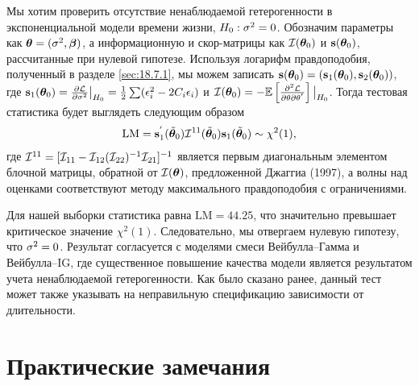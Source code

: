 Мы хотим проверить отсутствие ненаблюдаемой гетерогенности в экспоненциальной модели времени жизни, $H_0:\sigma^2=0$. Обозначим параметры как $\bm{\theta} = (\sigma^2, \bm{\beta})$, а информационную и скор-матрицы как $\mathcal{I}(\bm{\theta}_0)$ и $\mathbf{s}(\bm{\theta}_0)$, рассчитанные при нулевой гипотезе. Используя логарифм правдоподобия, полученный в разделе \ref{sec:18.7.1}, мы можем записать $\mathbf{s}(\bm{\theta}_0) = (\mathbf{s}_1(\bm{\theta}_0),\mathbf{s}_2(\bm{\theta}_0))$, где $\mathbf{s}_1(\bm{\theta}_0) = \frac{\partial\mathcal{L}}{\partial\sigma^2}\big|_{H_0} = \frac{1}{2}\sum(\epsilon^{2}_{i} - 2C_i\epsilon_i)$ и $\mathcal{I}(\bm{\theta}_0) = -\mathbb{E}\left[\frac{\partial^2\mathcal{L}}{\partial\theta\partial\theta^{'}}\right]\big|_{H_0}$. Тогда тестовая статистика будет выглядеть следующим образом
    \begin{align}
        \label{eq:18.36}
            \mathrm{LM} = \mathbf{s}^{'}_{1}(\tilde{\bm{\theta}}_0)\mathcal{I}^{11}(\tilde{\bm{\theta}}_0)\mathbf{s}_1(\tilde{\bm{\theta}}_0)\sim\chi^2(1),
    \end{align}
где $\mathcal{I}^{11} = [\mathcal{I}_{11} - \mathcal{I}_{12}(\mathcal{I}_{22})^{-1}\mathcal{I}_{21}]^{-1}$ является первым диагональным элементом блочной матрицы, обратной от $\mathcal{I}(\bm{\theta})$, предложенной Джаггиа (1997), а волны над оценками соответствуют методу максимального правдоподобия с ограничениями.

Для нашей выборки статистика равна $\mathrm{LM} = 44.25$, что значительно превышает критическое значение $\chi^{2}(1)$. Следовательно, мы отвергаем нулевую гипотезу, что $\sigma^2 = 0$. Результат согласуется с моделями смеси Вейбулла--Гамма и Вейбулла--IG, где существенное повышение качества модели является результатом учета ненаблюдаемой гетерогенности. Как было сказано ранее, данный тест может также указывать на неправильную спецификацию зависимости от длительности.




\section{Практические замечания}\label{sec:18.9}

